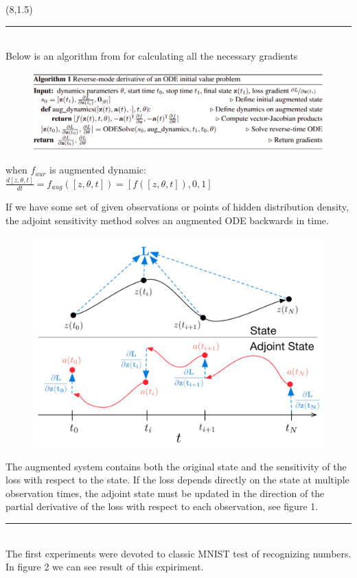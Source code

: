 \documentclass[a0]{a0poster}
\def\Head#1{\noindent{\LARGE\color{bluegray} #1}\bigskip}
\begin{document}
\begin{textblock}{7.0}(8,1.5)
\hrule\medskip
\Head{Algorithm}\\
Below is an algorithm from \cite{NeuralODE} for calculating all the necessary gradients
\begin{figure}
\centering
\includegraphics[width = \linewidth]{figures/grad_alg.png}
\end{figure}
when $f_{aur}$ is augmented dynamic: $ \frac{ d \left[ z, \theta, t  \right] }{dt}  = f_{aug} \left( \left[ z, \theta, t \right]  \right) = \left[ f \left(  \left[ z, \theta, t \right] \right) , 0  , 1 \right] $

If we have some set of given observations or points of hidden distribution density, the adjoint sensitivity method solves an augmented ODE backwards in time. \begin{figure}
\centering
\includegraphics[width = 0.7 \linewidth]{figures/backprop.png}
\caption{}
\end{figure} The augmented system contains both the original state and the sensitivity of the loss with respect to the state. If the loss depends directly on the state at multiple observation times, the adjoint state must be updated in the direction of the partial derivative of the loss with respect to each observation, see figure 1.

\medskip
\hrule\medskip
\Head{MNIST test}\\
The first experiments were devoted to classic MNIST test of recognizing numbers. In figure 2 we can see result of this expiriment. 


\end{textblock}
\end{document}
